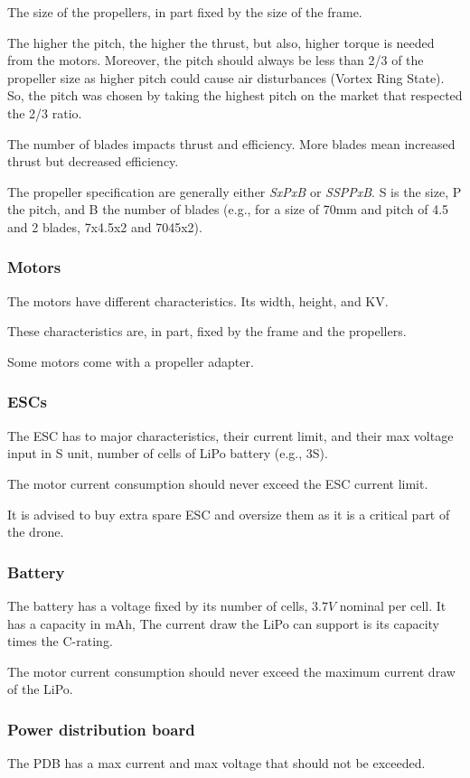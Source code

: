 The size of the propellers, in part fixed by the size of the frame.

The higher the pitch, the higher the thrust, but also, higher torque is needed from the motors.
Moreover, the pitch should always be less than 2/3 of the propeller size as higher pitch could cause air disturbances (Vortex Ring State).
So, the pitch was chosen by taking the highest pitch on the market that respected the 2/3 ratio.

The number of blades impacts thrust and efficiency. More blades mean increased thrust but decreased efficiency.

The propeller specification are generally either \emph{SxPxB} or \emph{SSPPxB}.
S is the size, P the pitch, and B the number of blades
(e.g., for a size of 70mm and pitch of 4.5 and 2 blades, 7x4.5x2 and 7045x2).

\subsubsection{Motors}
The motors have different characteristics. Its width, height, and KV.

These characteristics are, in part, fixed by the frame and the propellers.

Some motors come with a propeller adapter.

\subsubsection{ESCs}
The ESC has to major characteristics, their current limit, and their max voltage input in S unit, number of cells of LiPo battery (e.g., 3S).

The motor current consumption should never exceed the ESC current limit.

It is advised to buy extra spare ESC and oversize them as it is a critical part of the drone.

\subsubsection{Battery}
The battery has a voltage fixed by its number of cells, $3.7V$ nominal per cell.
It has a capacity in mAh,
The current draw the LiPo can support is its capacity times the C-rating.

The motor current consumption should never exceed the maximum current draw of the LiPo.

\subsubsection{Power distribution board}
The PDB has a max current and max voltage that should not be exceeded.

